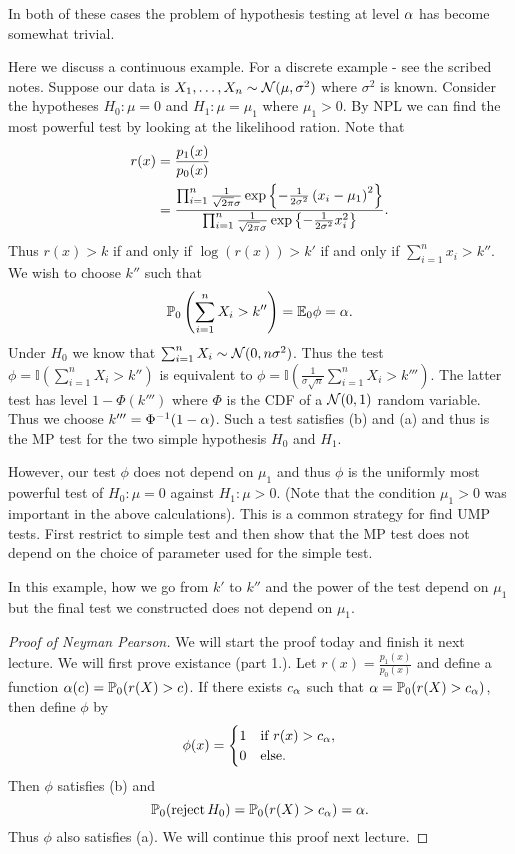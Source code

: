 In both of these cases the problem of hypothesis testing at level ${\alpha}$ has become somewhat trivial.

\begin{ex}
    Here we discuss a continuous example. For a discrete example - see the scribed notes. Suppose our data is $X_1,\ldots, X_n \sim {{\mathcal{N}}}(\mu,\sigma^2)$ where $\sigma^2$ is known. Consider the hypotheses $H_0 : \mu = 0$ and $H_1 : \mu = \mu_1$ where $\mu_1 > 0$. By NPL we can find the most powerful test by looking at the likelihood ration. Note that
    \begin{align*}
        r(x) &= \frac{p_1(x)}{p_0(x)}\\
        &= \frac{\prod_{i=1}^n \frac{1}{\sqrt{2\pi}\sigma}\exp\left\{-\frac{1}{2\sigma^2}\left(x_i-\mu_1\right)^2\right\}}{\prod_{i=1}^n \frac{1}{\sqrt{2\pi}\sigma}\exp\left\{-\frac{1}{2\sigma^2}x_i^2\right\}}.
    \end{align*}
    Thus $r(x) > k$ if and only if $\log(r(x)) > k'$ if and only if $\sum_{i=1}^n x_i > k''$. We wish to choose $k''$ such that 
    \[{\mathbb{P}}_0\left(\sum_{i=1}^n X_i > k''\right) ={\mathbb{E}}_0\phi = {\alpha}. \]
    Under $H_0$ we know that $\sum_{i=1}^n X_i \sim {{\mathcal{N}}}(0,n\sigma^2)$. Thus the test $\phi = \mathbb{I}(\sum_{i=1}^n X_i > k'')$ is equivalent to $\phi = \mathbb{I}(\frac{1}{\sigma \sqrt{n}}\sum_{i=1}^n X_i > k''')$. The latter test has level $1-\Phi(k''')$ where $\Phi$ is the CDF of a ${{\mathcal{N}}}(0,1)$ random variable. Thus we choose $k''' =  \Phi^{-1}(1-{\alpha})$. Such a test satisfies (b) and (a) and thus is the MP test for the two simple hypothesis $H_0$ and $H_1$.

    However, our test $\phi$ does not depend on $\mu_1$ and thus $\phi$ is the uniformly most powerful test of $H_0 : \mu =0$ against $H_1 : \mu > 0$. (Note that the condition $\mu_1 > 0$ was important in the above calculations). This is a common strategy for find UMP tests. First restrict to simple test and then show that the MP test does not depend on the choice of parameter used for the simple test. 
    
    In this example, how we go from $k'$ to $k''$ and the power of the test depend on $\mu_1$ but the final test we constructed does not depend on $\mu_1$.
\end{ex}
\begin{proof}[Proof of Neyman Pearson]
    We will start the proof today and finish it next lecture. We will first prove existance (part 1.). Let $r(x) = \frac{p_1(x)}{p_0(x)}$ and define a function ${\alpha}(c) = {\mathbb{P}}_0(r(X) > c)$. If there exists $c_{\alpha}$ such that ${\alpha} = {\mathbb{P}}_0(r(X) > c_{\alpha})$, then define $\phi$ by
    \[\phi(x) = \begin{cases}
        1 &\text{if } r(x) > c_{\alpha},\\
        0 & \text{else}.
    \end{cases} \]
    Then $\phi$ satisfies (b) and 
    \[{\mathbb{P}}_0(\operatorname{reject} H_0) = {\mathbb{P}}_0(r(X) > c_{\alpha}) = {\alpha}.\]
    Thus $\phi$ also satisfies (a). We will continue this proof next lecture.
\end{proof}
